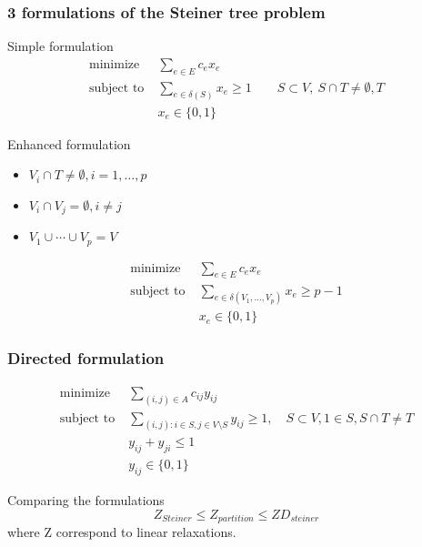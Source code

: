 \documentclass[9pt]{beamer}
\begin{document}
\begin{frame}
\frametitle{3 formulations of the Steiner tree problem}
\begin{block}{Simple formulation}
\begin{align*} 
\text{minimize} \;&\sum_{e\in E} c_ex_e\\
\text{subject to}\;& \sum_{e\in \delta(S)} x_e \geq 1 \qquad S\subset V,\ S\cap T \neq \emptyset,T\\
& x_e\in \{0,1\}
\end{align*}
\end{block}
\begin{block}{Enhanced formulation}
\begin{itemize}
\item<1-> $V_i\cap T\neq \emptyset, i=1,\ldots, p$
\item<1-> $V_i\cap V_j=\emptyset, i\neq j$
\item<1-> $V_1 \cup \cdots \cup V_p = V$
\end{itemize}
\begin{align*} 
\text{minimize} \;&\sum_{e\in E} c_ex_e\\
\text{subject to}\;& \sum_{e\in \delta(V_1,\ldots,V_p)} x_e \geq p-1 \\
& x_e\in \{0,1\}
\end{align*}
\end{block}
\end{frame}
\begin{frame}
\frametitle{Directed formulation}
\begin{align*}
\text{minimize}\; & \sum_{(i,j)\in A} c_{ij} y_{ij}\\
\text{subject to}\; & \sum_{(i,j): i\in S, j\in V\setminus S} y_{ij} \geq 1, \quad S\subset V, 1\in S, S\cap T\neq T\\
& y_{ij}+y_{ji}\leq 1\\
& y_{ij}\in \{0,1\}
\end{align*}
\begin{block}{Comparing the formulations}
$$Z_{Steiner} \leq Z_{partition} \leq ZD_{steiner}$$
where Z correspond to \alert{linear relaxations}.
\end{block}
\end{frame}
\end{document}
